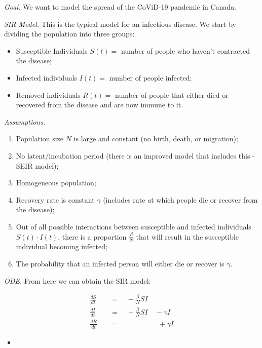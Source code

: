 \emph{Goal.} We want to model the spread of the CoViD-19 pandemic in Canada.

\vfill

\emph{SIR Model.} This is the typical model for an infectious disease. We start by dividing the population into three groups:
\begin{itemize}
\item Susceptible Individuals $S(t) = $ number of people who haven't contracted the disease;
\item Infected individuals $I(t)= $ number of people infected;
\item Removed individuals $R(t)=$ number of people that either died or recovered from the disease and are now immune to it.
\end{itemize}

\vfill

\emph{Assumptions.} 

\begin{enumerate}[label=\emph{(\alph*)}] 
\item Population size $N$ is large and constant (no birth, death, or migration);
\item No latent/incubation period (there is an improved model that includes this - SEIR model);
\item Homogeneous population;
\item Recovery rate is constant $\gamma$ (includes rate at which people die or recover from the disease);

\hfill

\item Out of all possible interactions between susceptible and infected individuals $S(t) \cdot I(t)$, there is a proportion $\frac{\beta}{N}$ that will result in the susceptible individual becoming infected;
\item The probability that an infected person will either die or recover is $\gamma$.

\end{enumerate}

\vfill

\emph{ODE. } From here we can obtain the SIR model:

\begin{emphbox}[]
\begin{align*}
\frac{dS}{dt} & \quad = \quad - \frac{\beta}{N} S I \\[5pt]
\frac{dI}{dt} & \quad = \quad + \frac{\beta}{N} S I  \quad - \gamma I \\[5pt]
\frac{dR}{dt} & \quad = \qquad \qquad \quad \;\, + \gamma I
\end{align*}
\end{emphbox}
\begin{video}
\begin{itemize}
	\item {}
\end{itemize}	
\end{video}


